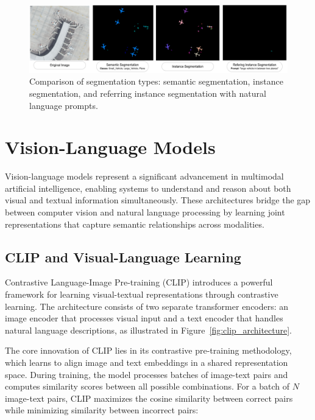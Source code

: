 \begin{figure}[htbp]
\centering
\includegraphics[width=1.0\textwidth]{../Images/segmentation.png}
\caption{Comparison of segmentation types: semantic segmentation, instance segmentation, and referring instance segmentation with natural language prompts.}
\label{fig:segmentation}
\end{figure}

\section{Vision-Language Models}

Vision-language models represent a significant advancement in multimodal artificial intelligence, enabling systems to understand and reason about both visual and textual information simultaneously. These architectures bridge the gap between computer vision and natural language processing by learning joint representations that capture semantic relationships across modalities.

\subsection{CLIP and Visual-Language Learning}

Contrastive Language-Image Pre-training (CLIP) introduces a powerful framework for learning visual-textual representations through contrastive learning. The architecture consists of two separate transformer encoders: an image encoder that processes visual input and a text encoder that handles natural language descriptions, as illustrated in Figure~\ref{fig:clip_architecture}.

The core innovation of CLIP lies in its contrastive pre-training methodology, which learns to align image and text embeddings in a shared representation space. During training, the model processes batches of image-text pairs and computes similarity scores between all possible combinations. For a batch of $N$ image-text pairs, CLIP maximizes the cosine similarity between correct pairs while minimizing similarity between incorrect pairs:


